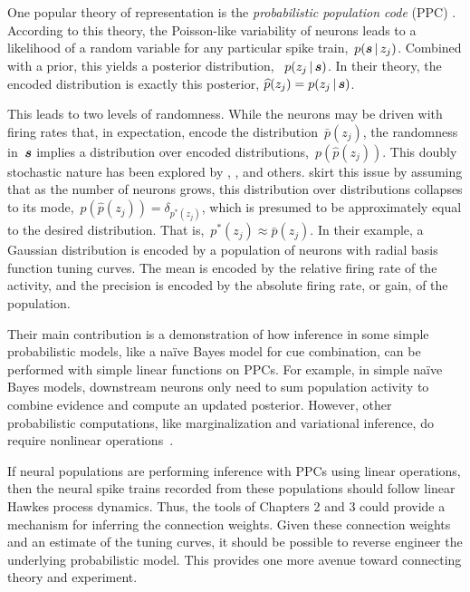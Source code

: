 One popular theory of representation is the \emph{probabilistic
  population code} (PPC) \citep{Ma2006}. According to this theory, the
Poisson-like variability of neurons leads to a likelihood of a random
variable for any particular spike train,~$p(\boldsymbol{s} \,|\, z_j)$.
Combined with a prior, this yields a posterior distribution,
~$p(z_j \,|\, \boldsymbol{s})$. In their theory, the encoded distribution is
exactly this posterior, $\widehat{p}(z_j) = p(z_j \,|\, \boldsymbol{s})$.

This leads to two levels of randomness. While
the neurons may be driven with firing rates that, in expectation,
encode the distribution~$\bar{p}(z_j)$, the randomness in~$\boldsymbol{s}$ implies
a distribution over encoded distributions,~$p(\widehat{p}(z_j))$. This doubly
stochastic nature has been explored by \citet{Zemel1998},
\citet{Sahani2003}, and others. \citet{Ma2006} skirt this issue by
assuming that as the number of neurons grows, this distribution over
distributions collapses to its mode,~$p(\widehat{p}(z_j)) = \delta_{p^*(z_j)}$,
which is presumed to be approximately equal to the desired distribution.
That is,~$p^*(z_j) \approx \bar{p}(z_j)$. In their example, a Gaussian
distribution is encoded by a population of neurons with radial
basis function tuning curves. The mean is encoded by the relative
firing rate of the activity, and the precision is encoded by the
absolute firing rate, or gain, of the population.

Their main contribution is a demonstration of how inference in some
simple probabilistic models, like a na\"ive Bayes model for cue
combination, can be performed with simple linear functions on
PPCs. For example, in simple na\"ive Bayes models, downstream neurons
only need to sum population activity to combine evidence and compute
an updated posterior. However, other probabilistic computations, like
marginalization and variational inference, do require nonlinear
operations~\citep{Beck2011, Beck2012}.

If neural populations are performing inference with PPCs using linear
operations, then the neural spike trains recorded from these
populations should follow linear Hawkes process dynamics.  Thus, the
tools of Chapters 2 and 3 could provide a mechanism for inferring the
connection weights.  Given these connection weights and an estimate of
the tuning curves, it should be possible to reverse engineer the
underlying probabilistic model. This provides one more avenue toward
connecting theory and experiment.


